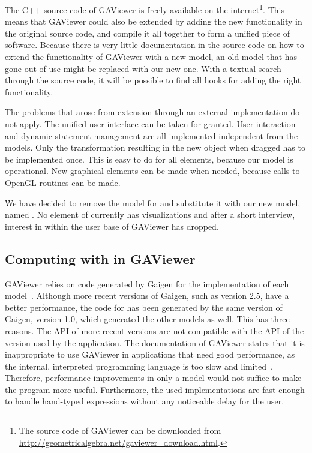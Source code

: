 The C++ source code of GAViewer is freely available on the internet\footnote{The source code of GAViewer can be downloaded from \url{http://geometricalgebra.net/gaviewer\_download.html}.}.  This means that GAViewer could also be extended by adding the new functionality in the original source code, and compile it all together to form a unified piece of software.  Because there is very little documentation in the source code on how to extend the functionality of GAViewer with a new model, an old model that has gone out of use might be replaced with our new one.  With a textual search through the source code, it will be possible to find all hooks for adding the right functionality.  

The problems that arose from extension through an external implementation do not apply.  The unified user interface can be taken for granted.  User interaction and dynamic statement management are all implemented independent from the models.  Only the transformation resulting in the new object when dragged has to be implemented once.  This is easy to do for all elements, because our model is operational.  New graphical elements can be made when needed, because calls to OpenGL routines can be made. 

We have decided to remove the model for \iga{} and substitute it with our new model, named \lga{}.  No element of \iga{} currently has visualizations and after a short interview, interest in \iga{} within the user base of GAViewer has dropped.

\subsection{Computing with \lga{} in GAViewer}
GAViewer relies on code generated by Gaigen for the implementation of each model~\cite{Gaigen}.  Although more recent versions of Gaigen, such as version 2.5, have a better performance, the code for \lga{} has been generated by the same version of Gaigen, version 1.0, which generated the other models as well.  This has three reasons.  The API of more recent versions are not compatible with the API of the version used by the application.  The documentation of GAViewer states that it is inappropriate to use GAViewer in applications that need good performance, as the internal, interpreted programming language is too slow and limited~\cite[page 7]{GAViewer}.  Therefore, performance improvements in only a model would not suffice to make the program more useful.  Furthermore, the used implementations are fast enough to handle hand-typed expressions without any noticeable delay for the user.

